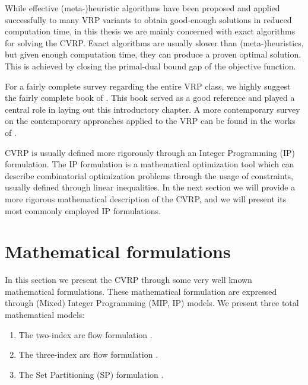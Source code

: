 While effective (meta-)heuristic algorithms have been proposed and applied
successfully to many VRP variants to obtain good-enough solutions
in reduced computation time, in this thesis we are mainly concerned
with exact algorithms for solving the CVRP.
Exact algorithms are usually slower than (meta-)heuristics, but given
enough computation time, they can produce a proven optimal solution.
This is achieved by closing the primal-dual bound gap of the objective function.

\medskip

For a fairly complete survey regarding the entire VRP class, we highly suggest
the fairly complete book  of \textcite{toth2014}.
This book served as a good reference and played a central role
in laying out this introductory chapter.
A more contemporary survey on the contemporary approaches applied
to the VRP can be found in the works of \textcite{baldacci2012, costa2019}.

\medskip


CVRP is usually defined more rigorously through an Integer Programming (IP) formulation.
The IP formulation is a mathematical optimization tool
which can describe combinatorial optimization problems
through the usage of constraints, usually defined through linear inequalities.
In the next section we will provide a more rigorous mathematical
description of the CVRP, and we will present its most commonly employed IP formulations.


\section{Mathematical formulations}
\label{sec:intro-cvrp-mathematical-formulations}

In this section we present the CVRP through some very well known mathematical formulations.
These mathematical formulation are expressed through (Mixed) Integer Programming (MIP, IP)
models.
We present three total mathematical models:

\begin{enumerate}
	\setlength{\itemsep}{0pt}
	\setlength{\parskip}{0pt}

	\item The two-index arc flow formulation \parencite{laporte1983, laporte1985, laporte1986}.
	\item The three-index arc flow formulation \parencite{golden1977}.
	\item The Set Partitioning (SP) formulation \parencite{balinski1964}.
\end{enumerate}

